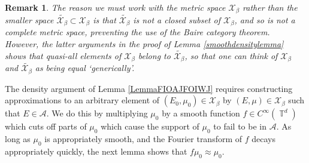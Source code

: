 \documentclass[dvipsnames,letterpaper,12pt]{article}
\numberwithin{equation}{section}
\DeclareMathOperator{\TT}{\mathbb{T}}
\newtheorem{remark}[theorem]{Remark}
\numberwithin{theorem}{section}
\begin{document}
\begin{remark}
    The reason we must work with the metric space $\mathcal{X}_\beta$ rather than the smaller space $\tilde{\mathcal{X}_\beta} \subset \mathcal{X}_\beta$ is that $\tilde{\mathcal{X}_\beta}$ is not a closed subset of $\mathcal{X}_\beta$, and so is not a complete metric space, preventing the use of the Baire category theorem. However, the latter arguments in the proof of Lemma \ref{smoothdensitylemma} shows that quasi-all elements of $\mathcal{X}_\beta$ belong to $\tilde{\mathcal{X}_\beta}$, so that one can think of $\mathcal{X}_\beta$ and $\tilde{\mathcal{X}_\beta}$ as being equal `generically'.
\end{remark}

The density argument of Lemma \ref{LemmaFIOAJFOIWJ} requires constructing approximations to an arbitrary element of $(E_0,\mu_0) \in \mathcal{X}_\beta$ by $(E,\mu) \in \mathcal{X}_\beta$ such that $E \in \mathcal{A}$. We do this by multiplying $\mu_0$ by a smooth function $f \in C^\infty(\TT^d)$ which cuts off parts of $\mu_0$ which cause the support of $\mu_0$ to fail to be in $\mathcal{A}$. As long as $\mu_0$ is appropriately smooth, and the Fourier transform of $f$ decays appropriately quickly, the next lemma shows that $f \mu_0 \approx \mu_0$.
\end{document}
